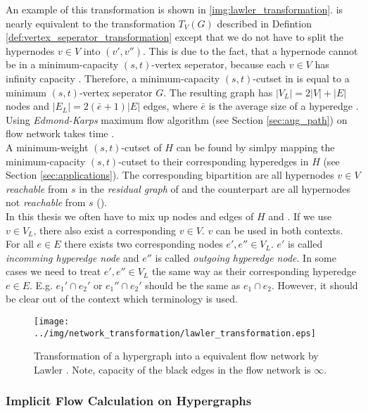 An example of this transformation is shown in \autoref{img:lawler_transformation}.
 is nearly equivalent to the transformation $T_V(G)$ described in Defintion \autoref{def:vertex_seperator_transformation}
except that we do not have to split the hypernodes $v \in V$ into $(v',v'')$. This is due to the fact, that
a hypernode cannot be in a minimum-capacity $(s,t)$-vertex seperator, because each $v \in V$ has
infinity capacity \cite{HuMoerder85}.
Therefore, a minimum-capacity $(s,t)$-cutset in  is equal to a minimum $(s,t)$-vertex seperator $G$.
The resulting graph  has $|V_L| = 2|V| + |E|$ nodes and $|E_L| = 2(\bar{e}+1)|E|$ edges, where
$\bar{e}$ is the average size of a hyperedge \cite{pistorius2003}. Using \emph{Edmond-Karps}
maximum flow algorithm (see Section \ref{sec:aug_path}) on flow network  
takes time  \cite{lawler1973}. \\
A minimum-weight $(s,t)$-cutset of $H$ can be found by simlpy mapping the minimum-capacity
$(s,t)$-cutset to their corresponding hyperedges in $H$ (see Section \ref{sec:applications}). 
The corresponding bipartition are all hypernodes $v \in V$ \emph{reachable} from $s$ in the 
\emph{residual graph} of  and the counterpart are all hypernodes not \emph{reachable}
from $s$ (). \\
In this thesis we often have to mix up nodes and edges of $H$ and . If we use
$v \in V_L$, there also exist a corresponding $v \in V$. $v$ can be used in both contexts.
For all $e \in E$ there exists two corresponding nodes $e',e'' \in V_L$. $e'$ 
is called \emph{incomming hyperedge node} and $e''$ is called \emph{outgoing hyperedge node}. 
In some cases we need to treat $e',e'' \in V_L$ the same way as their corresponding 
hyperedge $e \in E$. E.g. $e_1' \cap e_2'$ or $e_1'' \cap e_2'$ should be the same as $e_1 \cap e_2$.
However, it should be clear out of the context which terminology is used.


\begin{figure}
\centering
\texttt{[image: ../img/network\_transformation/lawler\_transformation.eps]}
\caption{Transformation of a hypergraph into a equivalent flow network by Lawler \cite{lawler1973}. Note,
capacity of the black edges in the flow network is $\infty$.}
\label{img:lawler_transformation}
\end{figure}

\subsubsection{Implicit Flow Calculation on Hypergraphs}


